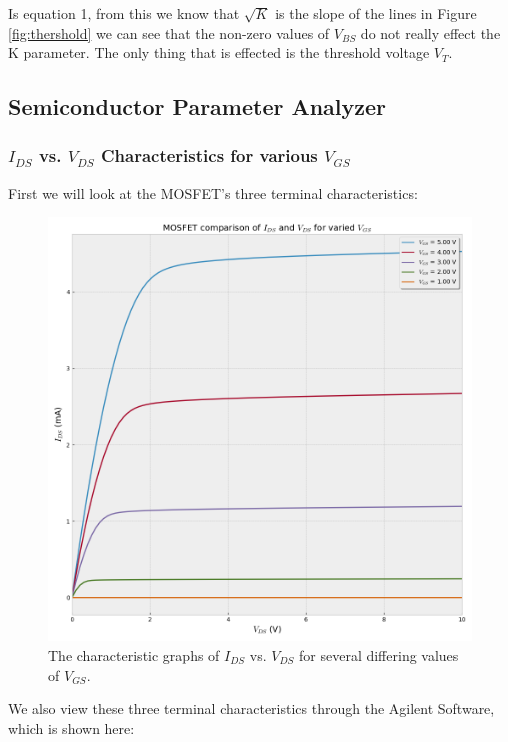 Is equation 1, from this we know that $\sqrt{K}$ is the slope of the lines in Figure \ref{fig:thershold} we can see that the non-zero values of $V_{BS}$ do not really effect the K parameter. The only thing that is effected is the threshold voltage $V_T$.
\clearpage
\subsection{Semiconductor Parameter Analyzer}

\subsubsection{\texorpdfstring{$I_{DS}$ vs. $V_{DS}$ Characteristics for various $V_{GS}$}{Dump to Source Current vs Voltage Characteristics for various Gate to Source Voltages}}

First we will look at the MOSFET's three terminal characteristics:

\begin{figure}[ht]
    \centering
    \includegraphics[width=.95\linewidth]{figures/characteristic_nothing.png}
    \caption{The characteristic graphs of $I_{DS}$ vs. $V_{DS}$ for several differing values of $V_{GS}$. }
    \label{fig:characteristic}
\end{figure}

\clearpage

We also view these three terminal characteristics through the Agilent Software, which is shown here:

